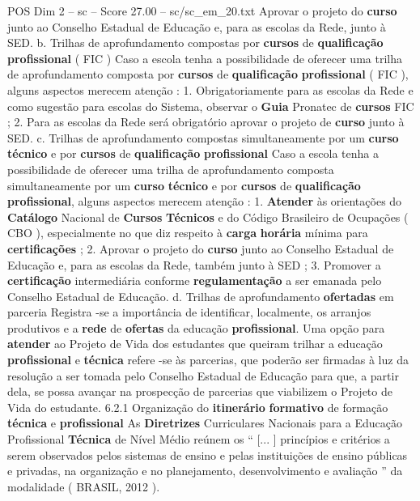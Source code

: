 \begin{textsample}{POS Dim 2 – sc – Score 27.00 – sc/sc\_em\_20.txt}
Aprovar o projeto do \textbf{curso} junto ao Conselho Estadual de Educação e, para as escolas da Rede, junto à SED. b.
Trilhas de aprofundamento compostas por \textbf{cursos} de \textbf{qualificação} \textbf{profissional} ( FIC ) Caso a escola tenha a possibilidade de oferecer uma trilha de aprofundamento composta por \textbf{cursos} de \textbf{qualificação} \textbf{profissional} ( FIC ), alguns aspectos merecem atenção : 1.
Obrigatoriamente para as escolas da Rede e como sugestão para escolas do Sistema, observar o \textbf{Guia} Pronatec de \textbf{cursos} FIC ; 2.
Para as escolas da Rede será obrigatório aprovar o projeto de \textbf{curso} junto à SED. c.
Trilhas de aprofundamento compostas simultaneamente por um \textbf{curso} \textbf{técnico} e por \textbf{cursos} de \textbf{qualificação} \textbf{profissional} Caso a escola tenha a possibilidade de oferecer uma trilha de aprofundamento composta simultaneamente por um \textbf{curso} \textbf{técnico} e por \textbf{cursos} de \textbf{qualificação} \textbf{profissional}, alguns aspectos merecem atenção : 1. \textbf{Atender} às orientações do \textbf{Catálogo} Nacional de \textbf{Cursos} \textbf{Técnicos} e do Código Brasileiro de Ocupações ( CBO ), especialmente no que diz respeito à \textbf{carga} \textbf{horária} mínima para \textbf{certificações} ; 2.
Aprovar o projeto do \textbf{curso} junto ao Conselho Estadual de Educação e, para as escolas da Rede, também junto à SED ; 3.
Promover a \textbf{certificação} intermediária conforme \textbf{regulamentação} a ser emanada pelo Conselho Estadual de Educação. d.
Trilhas de aprofundamento \textbf{ofertadas} em parceria Registra -se a importância de identificar, localmente, os arranjos produtivos e a \textbf{rede} de \textbf{ofertas} da educação \textbf{profissional}.
Uma opção para \textbf{atender} ao Projeto de Vida dos estudantes que queiram trilhar a educação \textbf{profissional} e \textbf{técnica} refere -se às parcerias, que poderão ser firmadas à luz da resolução a ser tomada pelo Conselho Estadual de Educação para que, a partir dela, se possa avançar na prospecção de parcerias que viabilizem o Projeto de Vida do estudante. 6.2.1 Organização do \textbf{itinerário} \textbf{formativo} de formação \textbf{técnica} e \textbf{profissional} As \textbf{Diretrizes} Curriculares Nacionais para a Educação Profissional \textbf{Técnica} de Nível Médio reúnem os “ [... ] princípios e critérios a serem observados pelos sistemas de ensino e pelas instituições de ensino públicas e privadas, na organização e no planejamento, desenvolvimento e avaliação ” da modalidade ( BRASIL, 2012 ).

\end{textsample}
